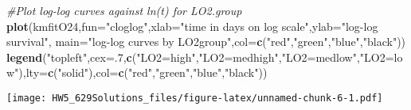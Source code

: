 \documentclass[]{article}
\newenvironment{Shaded}{\begin{snugshade}}{\end{snugshade}}
\newcommand{\CommentTok}[1]{\textcolor[rgb]{0.56,0.35,0.01}{\textit{#1}}}
\newcommand{\DataTypeTok}[1]{\textcolor[rgb]{0.13,0.29,0.53}{#1}}
\newcommand{\DecValTok}[1]{\textcolor[rgb]{0.00,0.00,0.81}{#1}}
\newcommand{\KeywordTok}[1]{\textcolor[rgb]{0.13,0.29,0.53}{\textbf{#1}}}
\newcommand{\NormalTok}[1]{#1}
\newcommand{\OperatorTok}[1]{\textcolor[rgb]{0.81,0.36,0.00}{\textbf{#1}}}
\newcommand{\StringTok}[1]{\textcolor[rgb]{0.31,0.60,0.02}{#1}}
\begin{document}
\begin{Shaded}
\begin{Highlighting}[]
\CommentTok{#Plot log-log curves against ln(t) for LO2.group}
\KeywordTok{plot}\NormalTok{(kmfitO24,}\DataTypeTok{fun=}\StringTok{"cloglog"}\NormalTok{,}\DataTypeTok{xlab=}\StringTok{"time in days on log scale"}\NormalTok{,}\DataTypeTok{ylab=}\StringTok{"log-log survival"}\NormalTok{, }\DataTypeTok{main=}\StringTok{"log-log curves by LO2group"}\NormalTok{,}\DataTypeTok{col=}\KeywordTok{c}\NormalTok{(}\StringTok{"red"}\NormalTok{,}\StringTok{"green"}\NormalTok{,}\StringTok{"blue"}\NormalTok{,}\StringTok{"black"}\NormalTok{))}
\KeywordTok{legend}\NormalTok{(}\StringTok{"topleft"}\NormalTok{,}\DataTypeTok{cex=}\NormalTok{.}\DecValTok{7}\NormalTok{,}\KeywordTok{c}\NormalTok{(}\StringTok{"LO2=high"}\NormalTok{,}\StringTok{"LO2=medhigh"}\NormalTok{,}\StringTok{"LO2=medlow"}\NormalTok{,}\StringTok{"LO2=low"}\NormalTok{),}\DataTypeTok{lty=}\KeywordTok{c}\NormalTok{(}\StringTok{"solid"}\NormalTok{),}\DataTypeTok{col=}\KeywordTok{c}\NormalTok{(}\StringTok{"red"}\NormalTok{,}\StringTok{"green"}\NormalTok{,}\StringTok{"blue"}\NormalTok{,}\StringTok{"black"}\NormalTok{))}
\end{Highlighting}
\end{Shaded}

\texttt{[image: HW5\_629Solutions\_files/figure-latex/unnamed-chunk-6-1.pdf]}

\begin{Shaded}
\end{Shaded}
\end{document}
